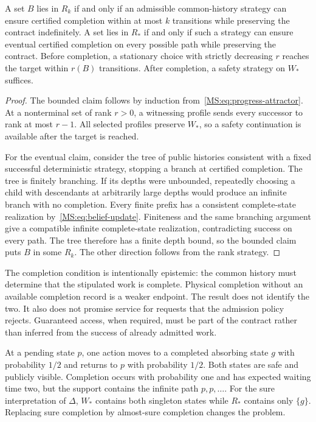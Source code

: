 \begin{MSproposition}\label{MS:prop:joint-progress}
A set $B$ lies in $R_k$ if and only if an admissible common-history strategy can ensure certified completion within at most $k$ transitions while preserving the contract indefinitely. A set lies in $R_*$ if and only if such a strategy can ensure eventual certified completion on every possible path while preserving the contract. Before completion, a stationary choice with strictly decreasing $r$ reaches the target within $r(B)$ transitions. After completion, a safety strategy on $W_*$ suffices.
\end{MSproposition}
\begin{proof}
The bounded claim follows by induction from~\eqref{MS:eq:progress-attractor}. At a nonterminal set of rank $r>0$, a witnessing profile sends every successor to rank at most $r-1$. All selected profiles preserve $W_*$, so a safety continuation is available after the target is reached.

For the eventual claim, consider the tree of public histories consistent with a fixed successful deterministic strategy, stopping a branch at certified completion. The tree is finitely branching. If its depths were unbounded, repeatedly choosing a child with descendants at arbitrarily large depths would produce an infinite branch with no completion. Every finite prefix has a consistent complete-state realization by~\eqref{MS:eq:belief-update}. Finiteness and the same branching argument give a compatible infinite complete-state realization, contradicting success on every path. The tree therefore has a finite depth bound, so the bounded claim puts $B$ in some $R_k$. The other direction follows from the rank strategy.
\end{proof}

The completion condition is intentionally epistemic: the common history must determine that the stipulated work is complete. Physical completion without an available completion record is a weaker endpoint. The result does not identify the two. It also does not promise service for requests that the admission policy rejects. Guaranteed access, when required, must be part of the contract rather than inferred from the success of already admitted work.

\begin{MScounterexample}\label{MS:ex:sure-service}
At a pending state $p$, one action moves to a completed absorbing state $g$ with probability $1/2$ and returns to $p$ with probability $1/2$. Both states are safe and publicly visible. Completion occurs with probability one and has expected waiting time two, but the support contains the infinite path $p,p,\ldots$. For the sure interpretation of $\Delta$, $W_*$ contains both singleton states while $R_*$ contains only $\{g\}$. Replacing sure completion by almost-sure completion changes the problem.
\end{MScounterexample}

